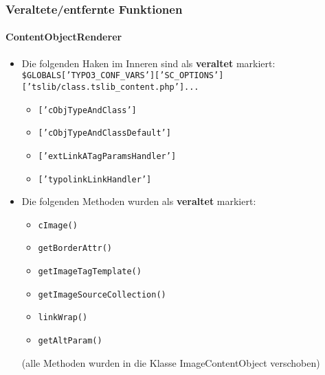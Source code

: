 \begin{frame}[fragile]
	\frametitle{Veraltete/entfernte Funktionen}
	\framesubtitle{ContentObjectRenderer}

	\begin{itemize}
		\item Die folgenden Haken im Inneren sind als \textbf{veraltet} markiert:\newline
			\tiny
				\texttt{\$GLOBALS['TYPO3\_CONF\_VARS']['SC\_OPTIONS']['tslib/class.tslib\_content.php']...}
			\normalsize

			\begin{itemize}\smaller
				\item \texttt{['cObjTypeAndClass']}
				\item \texttt{['cObjTypeAndClassDefault']}
				\item \texttt{['extLinkATagParamsHandler']}
				\item \texttt{['typolinkLinkHandler']}
			\end{itemize}

		\item Die folgenden Methoden wurden als \textbf{veraltet} markiert:

			\begin{itemize}\smaller
				\item \texttt{cImage()}
				\item \texttt{getBorderAttr()}
				\item \texttt{getImageTagTemplate()}
				\item \texttt{getImageSourceCollection()}
				\item \texttt{linkWrap()}
				\item \texttt{getAltParam()}
			\end{itemize}

			\smaller
				(alle Methoden wurden in die Klasse ImageContentObject verschoben)
			\normalsize

	\end{itemize}

\end{frame}


